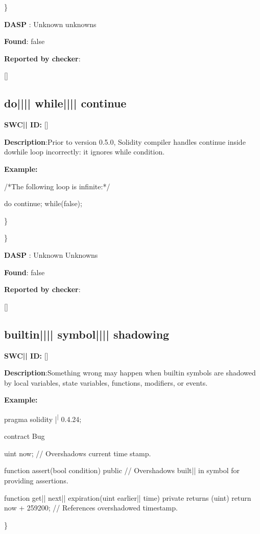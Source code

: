 \documentclass{article}
\begin{document}
\} 

\textbf{DASP} : Unknown unknowns

\textbf{Found}: false

\textbf{Reported by checker}: 
\begin{ffcode} 

[]
\end{ffcode} 
\subsection{do{||\textunderscore|| }while{||\textunderscore|| }continue} 
\textbf{SWC{|\textunderscore| }ID:} []

\textbf{Description}:Prior to version 0.5.0, Solidity compiler handles continue inside do{\textendash}while loop incorrectly: it ignores while condition.


\textbf{Example:} 
\begin{ffcode} 

/*The following loop is infinite:*/ 

do {
    continue;
} while(false);

\end{ffcode} 
\} 

\} 

\textbf{DASP} : Unknown Unknowns

\textbf{Found}: false

\textbf{Reported by checker}: 
\begin{ffcode} 

[]
\end{ffcode} 
\subsection{builtin{||\textunderscore|| }symbol{||\textunderscore|| }shadowing} 
\textbf{SWC{|\textunderscore| }ID:} []

\textbf{Description}:Something wrong may happen when built{\textendash}in symbols are shadowed by local variables, state variables, functions, modifiers, or events.


\textbf{Example:} 
\begin{ffcode} 

pragma solidity |\textsuperscript| 0.4.24;

contract Bug {
    uint now; // Overshadows current time stamp.

    function assert(bool condition) public {
        // Overshadows built|\textendash| in symbol for providing assertions.
    }

    function get|\textunderscore| next|\textunderscore| expiration(uint earlier|\textunderscore| time) private returns (uint) {
        return now + 259200; // References overshadowed timestamp.
    }
}

\end{ffcode} 
\} 
\end{document}
